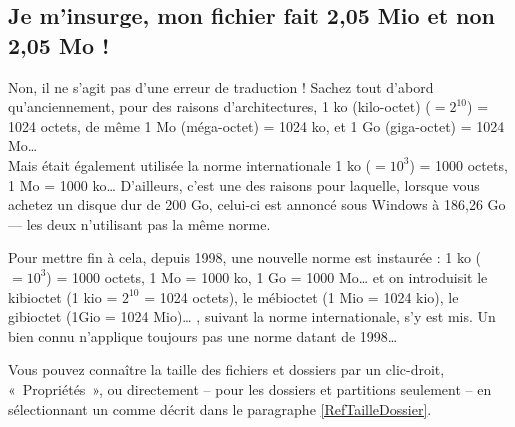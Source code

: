 \subsection{Je m'insurge, mon fichier fait  2,05 Mio et non 2,05 Mo !}
\label{RefMoMio}
Non, il ne s'agit pas d'une erreur de traduction ! Sachez tout d'abord qu'anciennement, pour des raisons d'architectures, 1 ko (kilo-octet) ($= 2^{10}$) = 1024 octets, de même 1 Mo (méga-octet) = 1024 ko, et 1 Go (giga-octet) = 1024 Mo\ldots{}\\
Mais était également utilisée la norme internationale 1 ko ($= 10^3$) = 1000 octets, 1 Mo = 1000 ko\ldots{} D'ailleurs, c'est une des raisons pour laquelle, lorsque vous achetez un disque dur de 200 Go, celui-ci est annoncé sous Windows à 186,26 Go --- les deux n'utilisant pas la même norme.\par
Pour mettre fin à cela, depuis 1998, une nouvelle norme est instaurée : 1 ko ($= 10^3$) = 1000 octets, 1 Mo = 1000 ko, 1 Go = 1000 Mo\ldots{} et on introduisit le kibioctet (1 kio = $2^{10}$ = 1024 octets), le mébioctet (1 Mio = 1024 kio), le gibioctet (1Gio = 1024 Mio)\ldots{} , suivant la norme internationale, s'y est mis. Un   bien connu n'applique toujours pas une norme datant de 1998\ldots{}\par
\begin{nota}
Vous pouvez connaître la taille des fichiers et dossiers par un clic-droit, «~Propriétés~», ou directement -- pour les dossiers et partitions seulement -- en sélectionnant un comme décrit dans le paragraphe \ref{RefTailleDossier}.
\end{nota}
